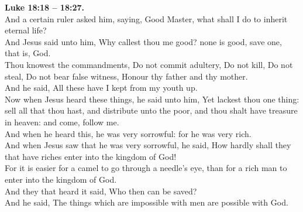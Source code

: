 \documentclass[10pt]{article} %
\begin{document}
{\begin{minipage}[t]{0.45\textwidth}
\textbf{Luke 18:18 -- 18:27.}\\
And a certain ruler asked him, saying, Good Master, what shall I do to inherit eternal life?\\
And Jesus said unto him, Why callest thou me good? none is good, save one, that is, God.\\
Thou knowest the commandments, Do not commit adultery, Do not kill, Do not steal, Do not bear false witness, Honour thy father and thy mother.\\
And he said, All these have I kept from my youth up.\\
Now when Jesus heard these things, he said unto him, Yet lackest thou one thing: sell all that thou hast, and distribute unto the poor, and thou shalt have treasure in heaven: and come, follow me.\\
And when he heard this, he was very sorrowful: for he was very rich.\\
And when Jesus saw that he was very sorrowful, he said, How hardly shall they that have riches enter into the kingdom of God!\\
For it is easier for a camel to go through a needle's eye, than for a rich man to enter into the kingdom of God.\\
And they that heard it said, Who then can be saved?\\
And he said, The things which are impossible with men are possible with God.\\
\end{minipage}}
\newpage\huge
\doublespacing %
\end{document}
